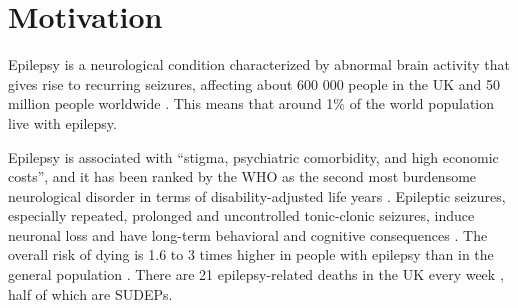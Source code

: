 \section{Motivation}

Epilepsy is a neurological condition characterized by abnormal brain activity that gives rise to recurring seizures, affecting about 600 000 people in the UK and 50 million people worldwide \cite{nice_epilepsies_2012,fiest_prevalence_2017}.
This means that around 1\% of the world population live with epilepsy.

Epilepsy is associated with ``stigma, psychiatric comorbidity, and high economic costs'', and it has been ranked by the \ac{WHO} as the second most burdensome neurological disorder in terms of disability-adjusted life years \cite{fiest_prevalence_2017}.
Epileptic seizures, especially repeated, prolonged and uncontrolled tonic-clonic seizures, induce neuronal loss and have long-term behavioral and cognitive consequences \cite{sutula_epileptic_2003}.
The overall risk of dying is 1.6 to 3 times higher in people with epilepsy than in the general population \cite{forsgren_mortality_2005}.
There are 21 epilepsy-related deaths in the UK every week%
,
half of which are \acp{SUDEP}.  %





